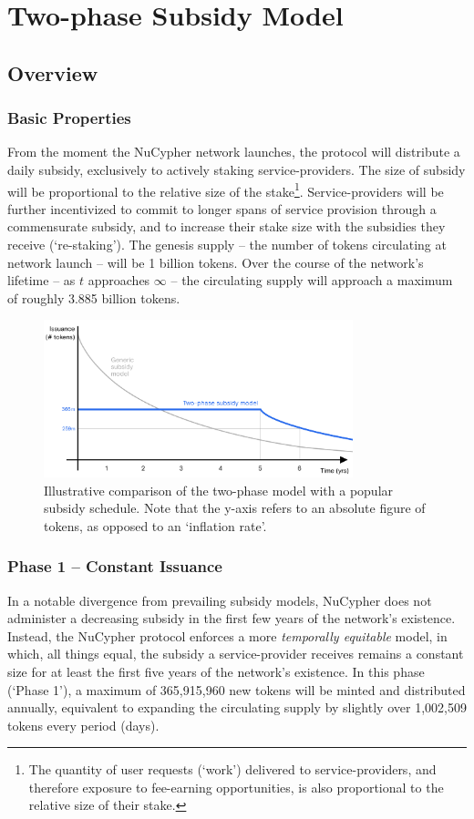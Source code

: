\documentclass[longbibliography,nofootinbib]{revtex4-1}
\begin{document}
\section{Two-phase Subsidy Model}

\subsection{Overview}

\subsubsection{Basic Properties}
From the moment the NuCypher network launches, the protocol will distribute a daily subsidy, exclusively to actively staking service-providers. The size of subsidy will be proportional to the relative size of the stake\footnote[2]{The quantity of user requests (`work') delivered to service-providers, and therefore exposure to fee-earning opportunities, is also proportional to the relative size of their stake.}. Service-providers will be further incentivized to commit to longer spans of service provision through a commensurate subsidy, and to increase their stake size with the subsidies they receive (`re-staking'). The genesis supply – the number of tokens circulating at network launch – will be 1 billion tokens. Over the course of the network's lifetime – as $t$ approaches $\infty$ – the circulating supply will approach a maximum of roughly 3.885 billion tokens.

\begin{figure}[h!]
    \includegraphics[width=0.8\textwidth]{Two_phase_model.png}
    \caption{Illustrative comparison of the two-phase model with a popular subsidy schedule. Note that the y-axis refers to an absolute figure of tokens, as opposed to an `inflation rate'.}
    \label{fig:tp}
\end{figure}

\subsubsection{Phase 1 – Constant Issuance}
In a notable divergence from prevailing subsidy models, NuCypher does not administer a decreasing subsidy in the first few years of the network's existence. Instead, the NuCypher protocol enforces a more \textit{temporally equitable} model, in which, all things equal, the subsidy a service-provider receives remains a constant size for at least the first five years of the network's existence. In this phase (`Phase 1'), a maximum of 365,915,960 new tokens will be minted and distributed annually, equivalent to expanding the circulating supply by slightly over 1,002,509 tokens every period (days). 
\end{document}

